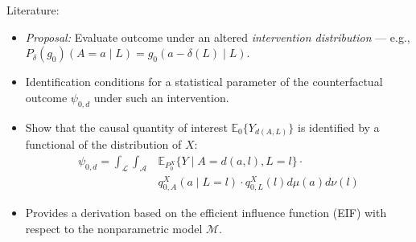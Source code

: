 \documentclass{beamer}
\newcommand{\E}{\mathbb{E}}
\begin{document}

\begin{frame}[c]{Literature: \cite{diaz2012population}}

\begin{center}
\begin{itemize}
  \itemsep10pt
  \item \textit{Proposal:} Evaluate outcome under an altered
    \textit{intervention distribution} --- e.g.,
    $P_{\delta}(g_0)(A = a \mid L) = g_0(a - \delta(L) \mid L)$.
  \item Identification conditions for a statistical parameter of the
    counterfactual outcome $\psi_{0,d}$ under such an intervention.
  \item Show that the causal quantity of interest $\E_0 \{Y_{d(A, L)}\}$ is
    identified by a functional of the distribution of $X$:
    \begin{align*}\label{eqn:identification2012}
      \psi_{0,d} = \int_{\mathcal{L}} \int_{\mathcal{A}} &\E_{P_0^X} \{Y \mid
        A = d(a, l), L = l\} \cdot \\ &q_{0, A}^X(a \mid L = l) \cdot
        q_{0, L}^X(l) d\mu(a)d\nu(l)
    \end{align*}
  \item Provides a derivation based on the efficient influence function (EIF)
    with respect to the nonparametric model $\mathcal{M}$.
\end{itemize}
\end{center}


\end{frame}
\end{document}
